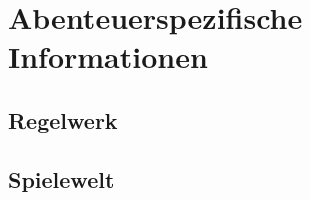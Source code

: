
\section*{Abenteuerspezifische Informationen}



\subsection*{Regelwerk}
\label{ssec:rules}



\subsection*{Spielewelt}
\label{ssec:world}


